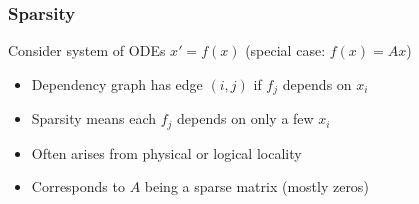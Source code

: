 \documentclass{beamer}
\begin{document}
\begin{frame}
  \frametitle{Sparsity}

  \begin{center}
  \end{center}

  Consider system of ODEs $x' = f(x)$ (special case: $f(x) = Ax$)
  \begin{itemize}
  \item 
    Dependency graph has edge $(i,j)$ if $f_j$ depends on $x_i$
  \item
    Sparsity means each $f_j$ depends on only a few $x_i$
  \item
    Often arises from physical or logical locality
  \item
    Corresponds to $A$ being a sparse matrix (mostly zeros)
  \end{itemize}
\end{frame}
\end{document}
